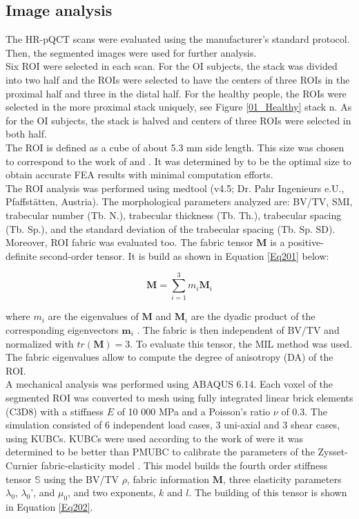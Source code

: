\documentclass[a4paper,fleqn]{DC_ArtStyle}
\begin{document}
\subsection{Image analysis}
The HR-pQCT scans were evaluated using the manufacturer's standard protocol. Then, the segmented images were used for further analysis.\\

Six ROI were selected in each scan. For the OI subjects, the stack was divided into two half and the ROIs were selected to have the centers of three ROIs in the proximal half and three in the distal half. For the healthy people, the ROIs were selected in the more proximal stack uniquely, see Figure \ref{01_Healthy} stack n. As for the OI subjects, the stack is halved and centers of three ROIs were selected in both half.\\

The ROI is defined as a cube of about 5.3 mm side length. This size was chosen to correspond to the work of \cite{Panyasantisuk2015} and \cite{Gross2013}. It was determined by \cite{Daszkiewicz2017} to be the optimal size to obtain accurate FEA results with minimal computation efforts.\\

The ROI analysis was performed using medtool (v4.5; Dr. Pahr Ingenieurs e.U., Pfaffstätten, Austria). The morphological parameters analyzed are: BV/TV, SMI, trabecular number (Tb. N.), trabecular thickness (Tb. Th.), trabecular spacing (Tb. Sp.), and the standard deviation of the trabecular spacing (Tb. Sp. SD). Moreover, ROI fabric was evaluated too. The fabric tensor $\mathbf{M}$ is a positive-definite second-order tensor. It is build as shown in Equation \ref{Eq201} below:

\begin{equation}
	\mathbf{M} = \sum_{i=1}^{3}{m_i \mathbf{M}_i}
	\label{Eq201}
\end{equation}

where $m_i$ are the eigenvalues of $\mathbf{M}$ and $\mathbf{M}_i$ are the dyadic product of the corresponding eigenvectors $\mathbf{m}_i$ \cite{Cowin1985} \cite{Harrigan1985}. The fabric is then independent of BV/TV and normalized with $tr(\mathbf{M}) = 3$. To evaluate this tensor, the MIL method was used. The fabric eigenvalues allow to compute the degree of anisotropy (DA) of the ROI.\\

A mechanical analysis was performed using ABAQUS 6.14. Each voxel of the segmented ROI was converted to mesh using fully integrated linear brick elements (C3D8) with a stiffness $E$ of 10 000 MPa and a Poisson's ratio $\nu$ of 0.3. The simulation consisted of 6 independent load cases, 3 uni-axial and 3 shear cases, using KUBCs. KUBCs were used according to the work of \cite{Panyasantisuk2015} were it was determined to be better than PMUBC to calibrate the parameters of the Zysset-Curnier fabric-elasticity model \cite{Zysset1995}. This model builds the fourth order stiffness tensor $\mathbb{S}$ using the BV/TV $\rho$, fabric information $\mathbf{M}$, three elasticity parameters $\lambda_0$, $\lambda_0$', and $\mu_0$, and two exponents, $k$ and $l$. The building of this tensor is shown in Equation \ref{Eq202}.
\end{document}
